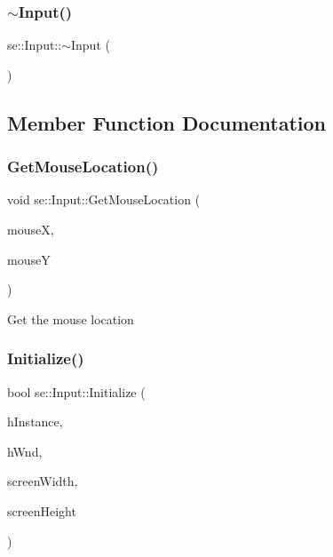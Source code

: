 \mbox{\label{classse_1_1_input_ad856d30ccdab1d654eb59b0895ade26c}} 
\subsubsection{\texorpdfstring{$\sim$\+Input()}{~Input()}}
{\footnotesize\ttfamily se\+::\+Input\+::$\sim$\+Input (\begin{DoxyParamCaption}{ }\end{DoxyParamCaption})}



\subsection{Member Function Documentation}
\mbox{\label{classse_1_1_input_a6088639b8f77563aad712a7c9708edf1}} 
\subsubsection{\texorpdfstring{Get\+Mouse\+Location()}{GetMouseLocation()}}
{\footnotesize\ttfamily void se\+::\+Input\+::\+Get\+Mouse\+Location (\begin{DoxyParamCaption}\item[{int \&}]{mouseX,  }\item[{int \&}]{mouseY }\end{DoxyParamCaption})}

Get the mouse location \mbox{\label{classse_1_1_input_a3f76e2bdfbd322766cc08a9ddda9727a}} 
\subsubsection{\texorpdfstring{Initialize()}{Initialize()}}
{\footnotesize\ttfamily bool se\+::\+Input\+::\+Initialize (\begin{DoxyParamCaption}\item[{H\+I\+N\+S\+T\+A\+N\+CE}]{h\+Instance,  }\item[{H\+W\+ND}]{h\+Wnd,  }\item[{int}]{screen\+Width,  }\item[{int}]{screen\+Height }\end{DoxyParamCaption})}

